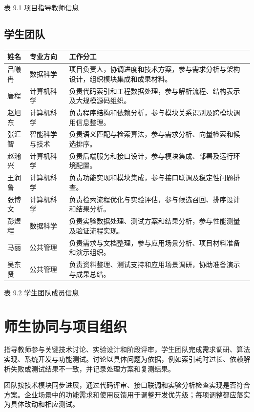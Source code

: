 表 9.1 项目指导教师信息

\subsection{学生团队}

\begin{center}\small
\begin{longtable}{P{0.12\textwidth}P{0.19\textwidth}P{0.59\textwidth}}
\toprule
姓名 & 专业方向 & 工作分工 \\
\midrule\endhead
吕曦冉 & 数据科学 & 项目负责人，协调进度和技术方案，参与需求分析与架构设计，组织模块集成和成果材料。 \\
唐程 & 计算机科学 & 负责代码索引和工程数据处理，参与解析流程、结构表示及大规模源码组织。 \\
赵旭东 & 计算机科学 & 负责程序结构和依赖分析，参与模块关系识别及跨模块调用信息整理。 \\
张汇智 & 智能科学与技术 & 负责语义匹配与检索算法，参与需求分析、向量检索和候选排序。 \\
赵瀚兴 & 计算机科学 & 负责后端服务和接口设计，参与模块集成、部署及运行环境配置。 \\
王润鲁 & 计算机科学 & 负责功能实现和模块集成，参与接口联调及稳定性问题排查。 \\
张博文 & 计算机科学 & 负责检索流程优化与实验评估，参与候选召回、排序设计和结果分析。 \\
彭煜程 & 数据科学 & 负责实验数据处理、测试方案和结果分析，参与性能测量及验证流程实现。 \\
马丽 & 公共管理 & 负责需求与文档整理，参与应用场景分析、项目材料准备和演示组织。 \\
吴东贤 & 公共管理 & 负责资料整理、测试支持和应用场景调研，协助准备演示与成果总结。 \\
\bottomrule
\end{longtable}\end{center}

表 9.2 学生团队成员信息

\section{师生协同与项目组织}

指导教师参与关键技术讨论、实验设计和阶段评审，学生团队完成需求调研、算法实现、系统开发与功能测试。讨论以具体问题为依据，例如索引耗时过长、依赖解析失败或测试结果不一致，并记录处理方案和复测结果。

团队按技术模块同步进展，通过代码评审、接口联调和实验分析检查实现是否符合方案。企业场景中的功能需求和使用反馈用于调整开发优先级；每项调整都应落实为具体改动和相应测试。

